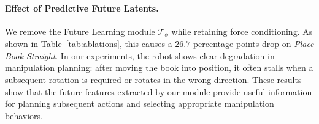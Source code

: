 \documentclass{article} %
\begin{document}
\paragraph{Effect of Predictive Future Latents.}
We remove the Future Learning module $\mathcal{T}_{\phi}$ while retaining force conditioning. As shown in Table~\ref{tab:ablations}, this causes a $26.7$ percentage points drop on \textit{Place Book Straight}. In our experiments, the robot shows clear degradation in manipulation planning: after moving the book into position, it often stalls when a subsequent rotation is required or rotates in the wrong direction. These results show that the future features extracted by our module provide useful information for planning subsequent actions and selecting appropriate manipulation behaviors.






\end{document}
